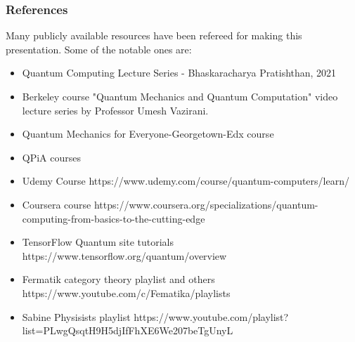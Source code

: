 \begin{frame}\frametitle{References}
Many publicly available resources have been refereed for making this presentation. Some of the notable ones are:
\small
\begin{itemize}
\item Quantum Computing Lecture Series - Bhaskaracharya Pratishthan, 2021
\item Berkeley course  "Quantum Mechanics and Quantum Computation" video lecture series by Professor Umesh Vazirani.
\item Quantum Mechanics for Everyone-Georgetown-Edx course
\item  QPiA courses
\item  Udemy Course https://www.udemy.com/course/quantum-computers/learn/
\item  Coursera course https://www.coursera.org/specializations/quantum-computing-from-basics-to-the-cutting-edge
\item  TensorFlow Quantum site tutorials https://www.tensorflow.org/quantum/overview
\item  Fermatik category theory playlist and others https://www.youtube.com/c/Fematika/playlists
\item  Sabine Physisists playlist https://www.youtube.com/playlist?list=PLwgQsqtH9H5djIfFhXE6We207beTgUnyL
\end{itemize}
\end{frame}

